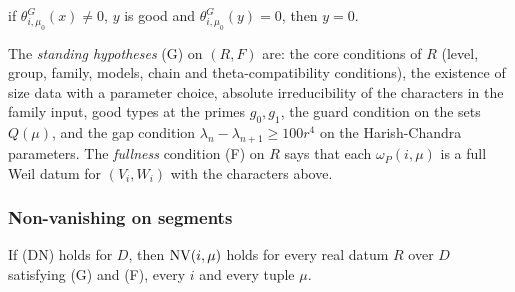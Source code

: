 \begin{definition}
\begin{enumerate}[label=(\alph*)]
if $\theta^G_{i,\mu_0}(x)\ne0$, $y$ is good and $\theta^G_{i,\mu_0}(y)=0$, then $y=0$.
\end{enumerate}
The \emph{standing hypotheses} (G) on $(R,F)$ are: the core conditions of $R$ (level, group, family, models, chain and theta-compatibility
conditions), the existence of size data with a parameter choice, absolute irreducibility of the characters in the family input, good types at the
primes $g_0,g_1$, the guard condition on the sets $Q(\mu)$, and the gap condition $\lambda_n-\lambda_{n+1}\ge100r^4$ on the Harish-Chandra
parameters. The \emph{fullness} condition (F) on $R$ says that each $\omega_P(i,\mu)$ is a full Weil datum for $(V_i,W_i)$ with the characters above.
\end{definition}

\subsubsection{Non-vanishing on segments}

\begin{proposition}\label{pf:liftinj:nonvan}
If (DN) holds for $D$, then $\mathrm{NV}(i,\mu)$ holds for every real datum $R$ over $D$ satisfying (G) and (F), every $i$ and every tuple $\mu$.
\end{proposition}


